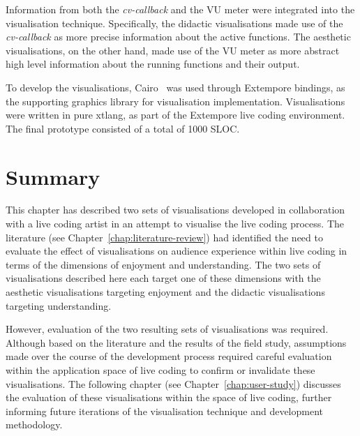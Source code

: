 Information from both the \textit{cv-callback} and the \ac{VU} meter were integrated into the visualisation technique. Specifically, the didactic visualisations made use of the \textit{cv-callback} as more precise information about the active functions. The aesthetic visualisations, on the other hand, made use of the \ac{VU} meter as more abstract high level information about the running functions and their output.

To develop the visualisations, Cairo~\cite{Worth2012} was used through Extempore bindings, as the supporting graphics library for visualisation implementation. Visualisations were written in pure xtlang, as part of the Extempore live coding environment. The final prototype consisted of a total of 1000 \ac{SLOC}.

\section{Summary}

This chapter has described two sets of visualisations developed in collaboration with a live coding artist in an attempt to visualise the live coding process. The literature (see Chapter~\ref{chap:literature-review}) had identified the need to evaluate the effect of visualisations on audience experience within live coding in terms of the dimensions of enjoyment and understanding. The two sets of visualisations described here each target one of these dimensions with the aesthetic visualisations targeting enjoyment and the didactic visualisations targeting understanding. 

However, evaluation of the two resulting sets of visualisations was required. Although based on the literature and the results of the field study, assumptions made over the course of the development process required careful evaluation within the application space of live coding to confirm or invalidate these visualisations. The following chapter (see Chapter~\ref{chap:user-study}) discusses the evaluation of these visualisations within the space of live coding, further informing future iterations of the visualisation technique and development methodology.



